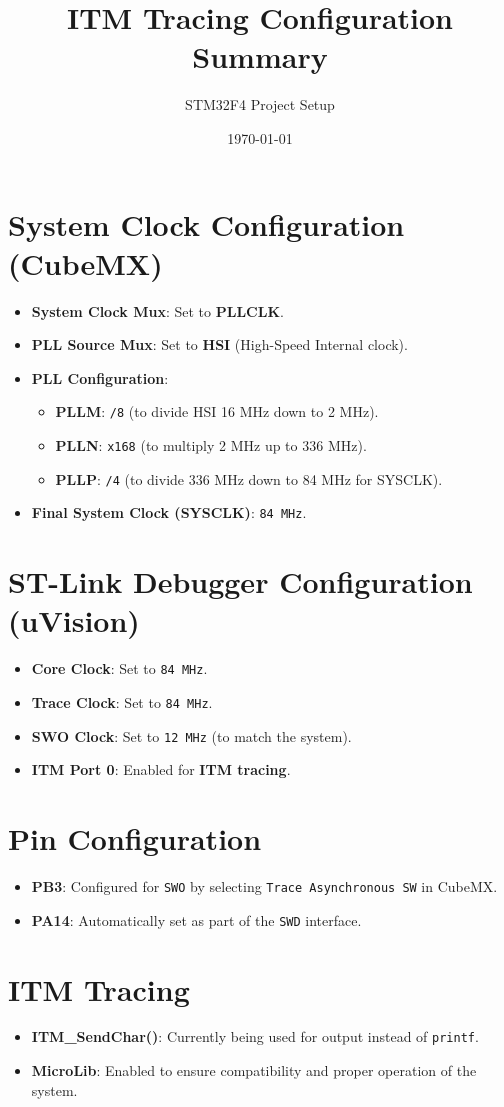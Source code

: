 \documentclass{article}
\begin{document}
\title{ITM Tracing Configuration Summary}
\author{STM32F4 Project Setup}
\date{\today}

\maketitle

\section{System Clock Configuration (CubeMX)}
\begin{itemize}
    \item \textbf{System Clock Mux}: Set to \textbf{PLLCLK}.
    \item \textbf{PLL Source Mux}: Set to \textbf{HSI} (High-Speed Internal clock).
    \item \textbf{PLL Configuration}: 
    \begin{itemize}
        \item \textbf{PLLM}: \texttt{/8} (to divide HSI 16 MHz down to 2 MHz).
        \item \textbf{PLLN}: \texttt{x168} (to multiply 2 MHz up to 336 MHz).
        \item \textbf{PLLP}: \texttt{/4} (to divide 336 MHz down to 84 MHz for SYSCLK).
    \end{itemize}
    \item \textbf{Final System Clock (SYSCLK)}: \texttt{84 MHz}.
\end{itemize}

\section{ST-Link Debugger Configuration (uVision)}
\begin{itemize}
    \item \textbf{Core Clock}: Set to \texttt{84 MHz}.
    \item \textbf{Trace Clock}: Set to \texttt{84 MHz}.
    \item \textbf{SWO Clock}: Set to \texttt{12 MHz} (to match the system).
    \item \textbf{ITM Port 0}: Enabled for \textbf{ITM tracing}.
\end{itemize}

\section{Pin Configuration}
\begin{itemize}
    \item \textbf{PB3}: Configured for \texttt{SWO} by selecting \texttt{Trace Asynchronous SW} in CubeMX.
    \item \textbf{PA14}: Automatically set as part of the \texttt{SWD} interface.
\end{itemize}

\section{ITM Tracing}
\begin{itemize}
    \item \textbf{ITM\_SendChar()}: Currently being used for output instead of \texttt{printf}.
    \item \textbf{MicroLib}: Enabled to ensure compatibility and proper operation of the system.
\end{itemize}
\end{document}

